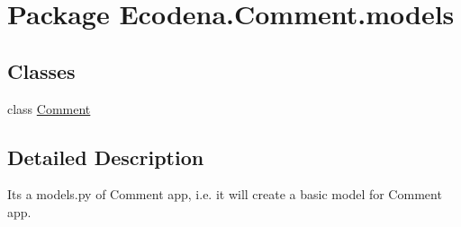 \hypertarget{namespace_ecodena_1_1_comment_1_1models}{
\section{Package Ecodena.Comment.models}
\label{d6/d07/namespace_ecodena_1_1_comment_1_1models}
}
\subsection*{Classes}
\begin{DoxyCompactItemize}
\item 
class \hyperlink{class_ecodena_1_1_comment_1_1models_1_1_comment}{Comment}
\end{DoxyCompactItemize}


\subsection{Detailed Description}
\begin{DoxyVerb}Its a models.py of Comment app, i.e. it will create a basic model for Comment app.\end{DoxyVerb}
 